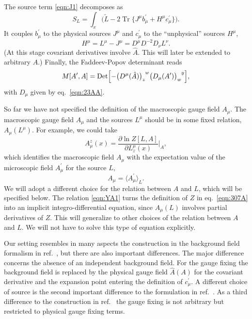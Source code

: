 \documentclass[twocolumn,aps,prd,amsmath,amssymb,preprintnumbers,longbibliography]{revtex4-1}
\numberwithin{equation}{section}
\DeclareMathOperator{\Tr}{Tr}
\DeclareMathOperator{\Det}{Det}
\begin{document}
The source term \eqref{eqn:J1} decomposes as
\begin{equation}\label{eqn:307D}
	S_L
	= \int_x \bigl(\tilde{L} - 2 \Tr\{J^\mu b^\prime_\mu + H^\mu c^\prime_\mu\}\bigr).
\end{equation}
It couples $b_\mu^\prime$ to the physical sources $J^\mu$ and $c^\prime_\mu$ to the ``unphysical'' sources $H^\mu$,
\begin{equation}\label{eqn:307E}
	H^\mu
	= L^\mu - J^\mu
	= D^\mu D^{-2} D_\nu L^\nu.
\end{equation}
(At this stage covariant derivatives involve $\hat{A}$. This will later be extended to arbitrary $A$.) Finally, the Faddeev-Popov determinant reads
\begin{equation}\label{eqn:307F}
	M[A^\prime,A]
	= \Det\Bigl[-\tensor{\bigl(D^\mu(\hat{A})\bigr)}{_z^w}\tensor{\bigl(D_\mu(A^\prime)\bigr)}{_w^y}\Bigr],
\end{equation}
with $D_\mu$ given by eq.~\eqref{eqn:23AA}.

So far we have not specified the definition of the macroscopic gauge field $A_\mu$. The macroscopic gauge field $A_\mu$ and the sources $L^\mu$ should be in some fixed relation, $A_\mu(L^\mu)$. For example, we could take
\begin{equation}\label{eqn:YA1}
	A_\mu^z(x)
	= \frac{\partial \ln Z[L,A]}{\partial L_z^\mu(x)}\Bigr|_A,
\end{equation}
which identifies the macroscopic field $A_\mu$ with the expectation value of the microscopic field $A_\mu^\prime$ for the source $L$,
\begin{equation}\label{eqn:YA2}
	A_\mu
	= \langle A_\mu^\prime\rangle_L.
\end{equation}
We will adopt a different choice for the relation between $A$ and $L$, which will be specified below. The relation \eqref{eqn:YA1} turns the definition of $Z$ in eq.~\eqref{eqn:307A} into an implicit integro-differential equation, since $A_\mu(L)$ involves partial derivatives of $Z$. This will generalize to other choices of the relation between $A$ and $L$. We will not have to solve this type of equation explicitly.

Our setting resembles in many aspects the construction in the background field formalism in ref.~\cite{RW}, but there are also important differences. The major difference concerns the absence of an independent background field. For the gauge fixing the background field is replaced by the physical gauge field $\hat{A}(A)$ for the covariant derivative and the expansion point entering the definition of $c_\mu^\prime$. A different choice of source is the second important difference to the formulation in ref.~\cite{RW}. As a third difference to the construction in ref.~\cite{RW} the gauge fixing is not arbitrary but restricted to physical gauge fixing terms.
\end{document}

